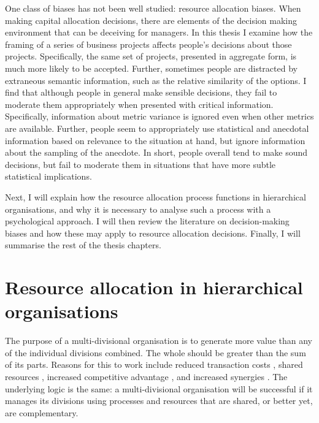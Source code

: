 \documentclass[a4paper, nobind, dvipsnames]{templates/ociamthesis}
\theoremstyle{definition}
\theoremstyle{definition}
\theoremstyle{definition}
\theoremstyle{definition}
\theoremstyle{remark}
\begin{document}
One class of biases has not been well studied: resource allocation biases. When
making capital allocation decisions, there are elements of the decision making
environment that can be deceiving for managers. In this thesis I examine how the
framing of a series of business projects affects people's decisions about those
projects. Specifically, the same set of projects, presented in aggregate form,
is much more likely to be accepted. Further, sometimes people are distracted by
extraneous semantic information, such as the relative similarity of the options.
I find that although people in general make sensible decisions, they fail to
moderate them appropriately when presented with critical information.
Specifically, information about metric variance is ignored even when other
metrics are available. Further, people seem to appropriately use statistical and
anecdotal information based on relevance to the situation at hand, but ignore
information about the sampling of the anecdote. In short, people overall tend to
make sound decisions, but fail to moderate them in situations that have more
subtle statistical implications.

Next, I will explain how the resource allocation process functions in
hierarchical organisations, and why it is necessary to analyse such a process
with a psychological approach. I will then review the literature on
decision-making biases and how these may apply to resource allocation decisions.
Finally, I will summarise the rest of the thesis chapters.

\section{Resource allocation in hierarchical organisations}

The purpose of a multi-divisional organisation is to generate more value than
any of the individual divisions combined. The whole should be greater than the
sum of its parts. Reasons for this to work include reduced transaction costs
\autocite{williamson1981,teece1982,teece1980,coase1937}, shared resources
\autocite{wernerfelt1984,barney1991}, increased competitive advantage \autocite{porter1998a,porter1998}, and increased synergies \autocite{barney1988}. The underlying logic is the
same: a multi-divisional organisation will be successful if it manages its
divisions using processes and resources that are shared, or better yet, are
complementary.
\end{document}
